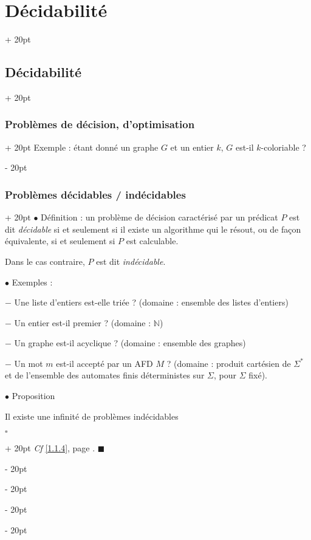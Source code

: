 \documentclass[a4paper, 12pt, twoside]{article}
\newcommand{\N}{\mathbb{N}} %
\newcommand{\ind}[1][20pt]{\advance\leftskip + #1}
\newcommand{\deind}[1][20pt]{\advance\leftskip - #1}
\newenvironment{indt}[2][20pt]{#2 \par \ind[#1]}{\par \deind} %
\newenvironment{proof}[1][{}]{\begin{indt}{$\square$ #1}}{$\blacksquare$ \end{indt}}
\begin{document}
\begin{indt}{\section{Décidabilité}}
\begin{indt}{\subsection{Décidabilité}}
\begin{indt}{\subsubsection{Problèmes de décision, d'optimisation}}
                Exemple : étant donné un graphe $G$ et un entier $k$, $G$ est-il $k$-coloriable ?
            \end{indt}

            \vspace{12pt}
            
            \begin{indt}{\subsubsection{Problèmes décidables / indécidables}}
                $\bullet$ Définition : un problème de décision caractérisé par un prédicat $P$ est dit \emph{décidable} si et seulement si il existe un algorithme qui le résout, ou de façon équivalente, si et seulement si $P$ est calculable.

                Dans le cas contraire, $P$ est dit \emph{indécidable}.

                \vspace{12pt}
                
                $\bullet$ Exemples :

                $-$ Une liste d'entiers est-elle triée ? (domaine : ensemble des listes d'entiers)

                $-$ Un entier est-il premier ? (domaine : $\N$)

                $-$ Un graphe est-il acyclique ? (domaine : ensemble des graphes)

                $-$ Un mot $m$ est-il accepté par un AFD $M$ ? (domaine : produit cartésien de $\Sigma^*$ et de l'ensemble des automates finis déterministes sur $\Sigma$, pour $\Sigma$ fixé).
                \vspace{12pt}
                
                $\bullet$ Proposition
                \begin{emphBox}
                    Il existe une infinité de problèmes indécidables
                \end{emphBox}
                
                \begin{proof}
                    \textit{Cf} \ref{1.1.4}, page \pageref{1.1.4}.
                \end{proof}
            \end{indt}

            \vspace{12pt}
            

\end{indt}
\end{indt}
\end{document}
